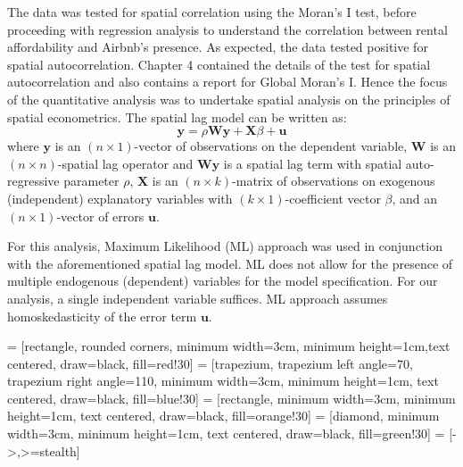 \documentclass[10pt,letterpaper,onecolumn]{article}
\begin{document}
The data was tested for spatial correlation using the Moran's I test,
before proceeding with regression analysis to understand the correlation
between rental affordability and Airbnb's presence. As expected, the
data tested positive for spatial autocorrelation. Chapter 4 contained
the details of the test for spatial autocorrelation and also contains a
report for Global Moran's I. Hence the focus of the quantitative
analysis was to undertake spatial analysis on the principles of spatial
econometrics. The spatial lag model can be written as:
  \[\mathbf{y} = \rho \mathbf{W y} + \mathbf{X}\beta + \mathbf{u}\]
where \(\mathbf{y}\) is an \((n \times 1)\)-vector of observations on the dependent variable, \(\mathbf{W}\) is an \((n \times n)\)-spatial lag operator and \(\mathbf{Wy}\) is a spatial lag term with spatial auto-regressive parameter \(\rho\), \(\mathbf{X}\) is an \((n \times k)\)-matrix of observations on exogenous (independent) explanatory variables
with \((k \times 1)\)-coefficient vector \(\beta\), and an \((n \times 1)\)-vector of errors \(\mathbf{u}\).

For this analysis, Maximum Likelihood (ML) approach was used in
conjunction with the aforementioned spatial lag model. ML does not allow
for the presence of multiple endogenous (dependent) variables for the
model specification. For our analysis, a single independent variable
suffices. ML approach assumes homoskedasticity of the error term
\(\mathbf{u}\).

 = [rectangle, rounded corners, minimum width=3cm, minimum height=1cm,text centered, draw=black, fill=red!30]
 = [trapezium, trapezium left angle=70, trapezium right angle=110, minimum width=3cm, minimum height=1cm, text centered, draw=black, fill=blue!30]
 = [rectangle, minimum width=3cm, minimum height=1cm, text centered, draw=black, fill=orange!30]
 = [diamond, minimum width=3cm, minimum height=1cm, text centered, draw=black, fill=green!30]
 = [->,>=stealth]
\end{document}
